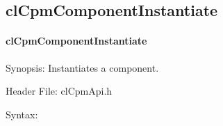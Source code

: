 {\subsection{clCpmComponentInstantiate}
\hypertarget{pagecpm125}{}\paragraph{cl\-Cpm\-Component\-Instantiate}\label{pagecpm125}
\begin{Desc}
\item[Synopsis:]Instantiates a component.\end{Desc}
\begin{Desc}
\item[Header File:]clCpmApi.h\end{Desc}
\begin{Desc}
\item[Syntax:]


\end{Desc}}
